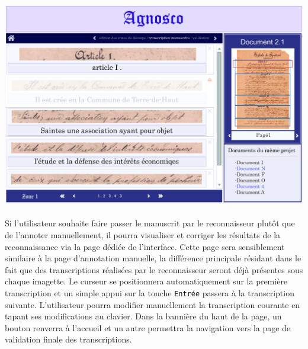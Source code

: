 \begin{mdframed}[frametitle={Figure 4 : Maquette de la page d'annotation manuelle}, innerbottommargin=10]
\begin{center}
\includegraphics[scale=0.04]{assets/maquetteIHMtranscriptionmanu.jpg}
\end{center}
\end{mdframed}

\paragraph{}
Si l’utilisateur souhaite faire passer le manuscrit par le reconnaisseur plutôt que de l’annoter manuellement, il pourra visualiser et corriger les résultats de la reconnaissance via la page dédiée de l’interface. Cette page sera sensiblement similaire à la page d’annotation manuelle, la différence principale résidant dans le fait que des transcriptions réalisées par le reconnaisseur seront déjà présentes sous chaque imagette. Le curseur se positionnera automatiquement sur la première transcription et un simple appui sur la touche \texttt{Entrée} passera à la transcription suivante. L’utilisateur pourra modifier manuellement la transcription courante en tapant ses modifications au clavier.
\newline{}
Dans la bannière du haut de la page, un bouton renverra à l’accueil et un autre permettra la navigation vers la page de validation finale des transcriptions.

\newpage{}

